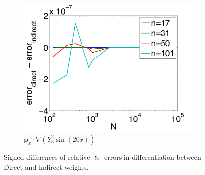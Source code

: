 \begin{figure}[htbp]
	\begin{subfigure}[b]{0.425\textwidth}
	\includegraphics[width=1.0\textwidth]{../figures/appendices/direct_vs_indirect_weights/compare_weight_generation/xsfc_vs_xsfc_alt_on_sph32_times_sine_20x/diff_of_rel_l2_errors.pdf}
	\caption{$\mathbf{p}_{x} \cdot \nabla ( Y_{3}^{2} \sin(20 x))$}
	\end{subfigure}
	\caption{Signed differences of relative $\ell_{2}$ errors in differentiation between Direct and Indirect weights.}
\end{figure}


